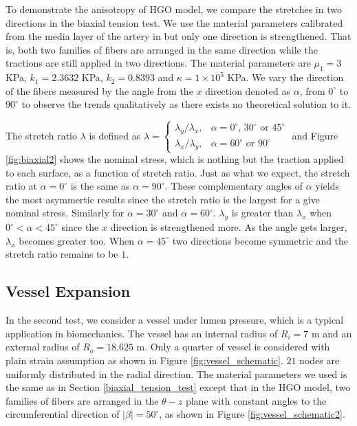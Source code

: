 To demonstrate the anisotropy of HGO model, we compare the stretches in two directions in the biaxial tension test. We use the material parameters calibrated from the media layer of the artery in \cite{Holzapfel2} but only one direction is strengthened. That is, both two families of fibers are arranged in the same direction while the tractions are still applied in two directions. The material parameters are $\mu_1 = 3$ KPa, $k_1 = 2.3632$ KPa, $k_2 = 0.8393$ and $\kappa = 1 \times 10^5$ KPa. We vary the direction of the fibers measured by the angle from the $x$ direction denoted as $\alpha$, from $0^\circ$ to $90^\circ$ to observe the trends qualitatively as there exists no theoretical solution to it. 

The stretch ratio $\lambda$ is defined as $\lambda = 
\begin{cases}
	\lambda_y/\lambda_x, & \text{$\alpha = 0^\circ$, $30^\circ$ or $45^\circ$} \\
	\lambda_x/\lambda_y, & \text{$\alpha = 60^\circ$ or $90^\circ$}
\end{cases}
$ 
and Figure \ref{fig:biaxial2} shows the nominal stress, which is nothing but the traction applied to each surface, as a function of stretch ratio. Just as what we expect, the stretch ratio at $\alpha = 0^\circ$ is the same as $\alpha = 90^\circ$. These complementary angles of $\alpha$ yields the most asymmertic results since the stretch ratio is the largest for a give nominal stress. Similarly for $\alpha = 30^\circ$ and $\alpha = 60^\circ$. 
$\lambda_y$ is greater than $\lambda_x$ when $0^\circ < \alpha < 45^\circ$ since the $x$ direction is strengthened more. As the angle gets larger, $\lambda_x$ becomes greater too. When $\alpha = 45^\circ$ two directions become symmetric and the stretch ratio remains to be $1$.
 

\subsection{Vessel Expansion}
\label{pressure_vessel}
In the second test, we consider a vessel under lumen pressure, which is a typical application in biomechanics. The vessel has an internal radius of $R_i = 7$ m and an external radius of $R_o = 18.625$ m. Only a quarter of vessel is considered with plain strain assumption as shown in Figure \ref{fig:vessel_schematic}. $21$ nodes are uniformly distributed in the radial direction. The material parameters we used is the same as in Section \ref{biaxial_tension_test} except that in the HGO model, two families of fibers are arranged in the $\theta-z$ plane with constant angles to the circumferential direction of $|\beta| = 50^\circ$, as shown in Figure \ref{fig:vessel_schematic2}.

